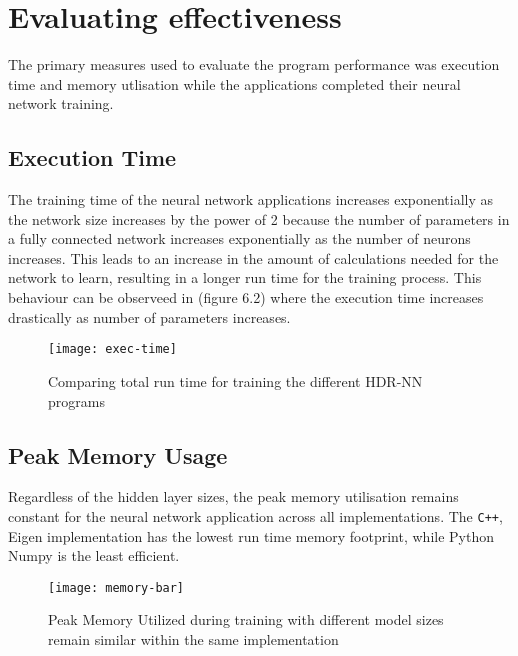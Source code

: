 
\section{Evaluating effectiveness}


The primary measures used to evaluate the program performance was execution time and memory utlisation while the applications completed their neural network training.

\subsection{Execution Time}
The training time of the neural network applications increases exponentially as the network size increases by the power of 2 because the number of parameters in a fully connected network increases exponentially as the number of neurons increases. This leads to an increase in the amount of calculations needed for the network to learn, resulting in a longer run time for the training process. This behaviour can be observeed in (figure 6.2) where the execution time increases drastically as number of parameters increases.

\begin{figure}[!ht]
	\centering
	\texttt{[image: exec-time]}
	\caption[Execution Time vs Model Parameters]{Comparing total run time for training the different HDR-NN programs}
\end{figure}

\subsection{Peak Memory Usage}
Regardless of the hidden layer sizes, the peak memory utilisation remains constant for the neural network application across all implementations. The \texttt{C++}, Eigen implementation has the lowest run time memory footprint, while Python Numpy is the least efficient.

\begin{figure}[!ht]
	\centering
	\texttt{[image: memory-bar]}
	\caption[Peak Memory Utilisation]{Peak Memory Utilized during training with different model sizes remain similar within the same implementation}
\end{figure}

